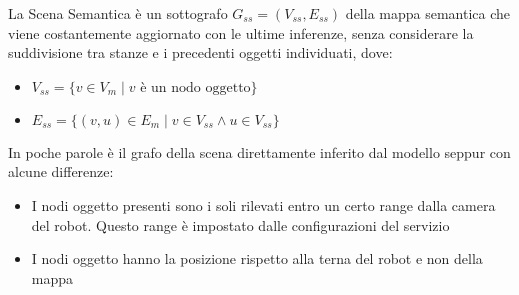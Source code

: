 La Scena Semantica è un sottografo $G_{ss} = (V_{ss}, E_{ss})$ della mappa semantica che viene costantemente aggiornato con le ultime inferenze, senza considerare la suddivisione tra stanze e i precedenti oggetti individuati, dove:
\begin{itemize}
  \item $V_{ss} = \{v \in V_m \mid v \text{ è un nodo oggetto} \}$
  \item $E_{ss} = \{(v,u) \in E_m \mid v \in V_{ss} \wedge u \in V_{ss} \}$
\end{itemize}
In poche parole è il grafo della scena direttamente inferito dal modello seppur con alcune differenze:
\begin{itemize}
  \item I nodi oggetto presenti sono i soli rilevati entro un certo range dalla camera del robot. Questo range è impostato dalle configurazioni del servizio
  \item I nodi oggetto hanno la posizione rispetto alla terna del robot e non della mappa
\end{itemize}



